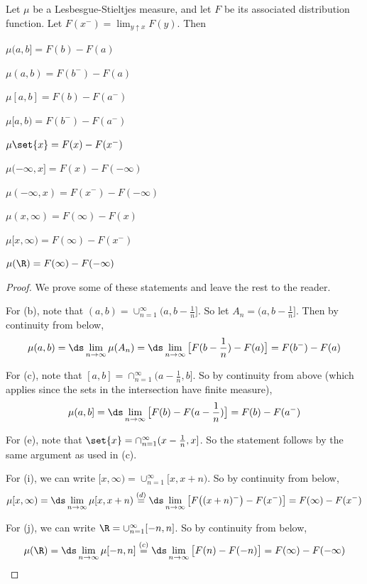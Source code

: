 \documentclass{article} %
\begin{document}
 \begin{proposition}
 Let $\mu$ be a Lesbesgue-Stieltjes measure, and let $F$ be its associated distribution function.    Let $F(x^-) = \lim_{y \uparrow x} F(y)$. Then 

 \begin{alphabate}
 \item $\mu(a,b] = F(b) - F(a)$	
 \item $\mu(a,b) = F(b^-) - F(a)$	
 \item $\mu[a,b] = F(b) - F(a^-)$	
 \item $\mu[a,b) = F(b^-) - F(a^-)$	
 \item $\mu\set{x} = F(x) - F(x^-)$	
 \item $\mu(-\infty,x] = F(x) - F(-\infty)$	
 \item $\mu(-\infty,x) = F(x^-) - F(-\infty)$	
 \item $\mu(x,\infty) = F(\infty) - F(x)$	
 \item $\mu[x,\infty) = F(\infty) - F(x^-)$	
 \item $\mu(\R) = F(\infty) - F(-\infty)$	
 \end{alphabate}
 \label{prop:properties_of_LS_measures}
\end{proposition}

\begin{proof}
We prove some of these statements and leave the rest to the reader.  

For (b), note that $(a,b) = \cup_{n=1}^\infty (a, b-\frac{1}{n}]$.  So let $A_n = (a, b-\frac{1}{n}]$. Then  by continuity from below,
\[\mu(a,b) = \ds\lim_{n \to \infty}  \mu(A_n) = \ds\lim_{n \to \infty} \big[F(b-\frac{1}{n}) - F(a) \big] = F(b^-) - F (a) \]

For (c), note that $[a,b] = \cap_{n=1}^\infty (a-\frac{1}{n}, b]$.   So by continuity from above (which applies since the sets in the intersection have finite measure),
\[\mu(a,b] = \ds\lim_{n \to \infty} \big[F(b) - F(a - \frac{1}{n}) \big] = F(b) - F (a^-) \]

For (e), note that $\set{x} = \cap_{n=1}^\infty (x-\frac{1}{n}, x]$.   So the statement follows by the same argument as used in (c).

For (i), we can write $[x,\infty) = \cup_{n=1}^\infty [x, x+n)$.  So by continuity from below, 
\[\mu[x,\infty) = \ds\lim_{n \to \infty}  \mu[x, x+n) \stackrel{(d)}{=} \ds\lim_{n \to \infty} \big[ F\big( (x+n)^- \big) - F(x^-) \big] = F(\infty) - F(x^-) \]

For (j), we can write $\R = \cup_{n=1}^\infty [-n, n]$.  So by continuity from below, 
\[\mu(\R) = \ds\lim_{n \to \infty}  \mu[-n,n] \stackrel{(c)}{=} \ds\lim_{n \to \infty} \big[ F(n) - F(-n) \big] = F(\infty) - F(-\infty) \]
\end{proof}
\end{document}
